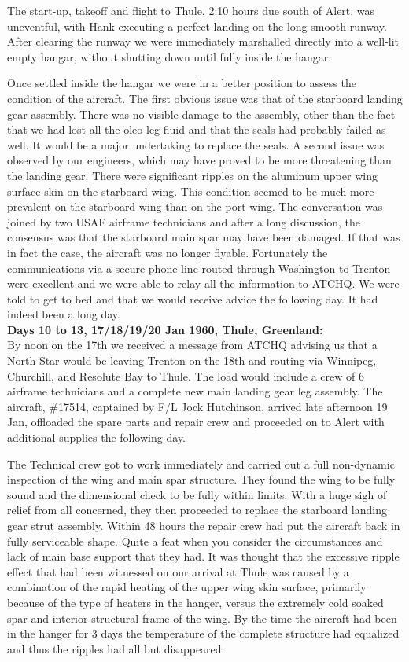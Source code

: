 The start-up, takeoff and flight to Thule, 2:10 hours due south of
Alert, was uneventful, with Hank executing a perfect landing on the
long smooth runway. After clearing the runway we were immediately
marshalled directly into a well-lit empty hangar, without shutting down
until fully inside the hangar.

Once settled inside the hangar we were in a better position to assess
the condition of the aircraft. The first obvious issue was that of the
starboard landing gear assembly. There was no visible damage to the
assembly, other than the fact that we had lost all the oleo leg fluid
and that the seals had probably failed as well. It would be a major
undertaking to replace the seals. A second issue was observed by our
engineers, which may have proved to be more threatening than the
landing gear. There were significant ripples on the aluminum upper wing
surface skin on the starboard wing. This condition seemed to be much
more prevalent on the starboard wing than on the port wing. The
conversation was joined by two USAF airframe technicians and after a
long discussion, the consensus was that the starboard main spar may
have been damaged. If that was in fact the case, the aircraft was no
longer flyable. Fortunately the communications via a secure phone line
routed through Washington to Trenton were excellent and we were able to
relay all the information to ATCHQ. We were told to get to bed and that
we would receive advice the following day. It had indeed been a long
day.\\

\noindent\textbf{Days 10 to 13, 17/18/19/20 Jan 1960, Thule, Greenland:}\\

By noon on the 17th we received a message from ATCHQ advising us that a
North Star would be leaving Trenton on the 18th and routing via
Winnipeg, Churchill, and Resolute Bay to Thule. The load would include
a crew of 6 airframe technicians and a complete new main landing gear
leg assembly. The aircraft, \#17514, captained by F/L Jock Hutchinson,
arrived late afternoon 19 Jan, offloaded the spare parts and repair
crew and proceeded on to Alert with additional supplies the following
day.

The Technical crew got to work immediately and carried out a full
non-dynamic inspection of the wing and main spar structure. They found
the wing to be fully sound and the dimensional check to be fully within
limits. With a huge sigh of relief from all concerned, they then
proceeded to replace the starboard landing gear strut assembly. Within
48 hours the repair crew had put the aircraft back in fully serviceable
shape. Quite a feat when you consider the circumstances and lack of
main base support that they had. It was thought that the excessive
ripple effect that had been witnessed on our arrival at Thule was
caused by a combination of the rapid heating of the upper wing skin
surface, primarily because of the type of heaters in the hanger, versus
the extremely cold soaked spar and interior structural frame of the
wing. By the time the aircraft had been in the hanger for 3 days the
temperature of the complete structure had equalized and thus the
ripples had all but disappeared.\\

